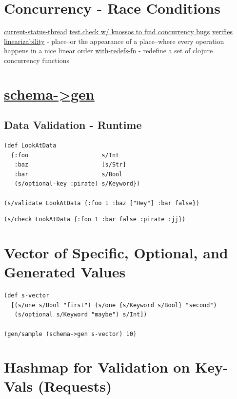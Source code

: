\documentclass[11pt]{article}
\begin{document}
\section{Concurrency - Race Conditions}
\label{sec-23}

\href{https://groups.google.com/forum/#!topic/clojure-dev/GhG-PbKW_ew}{current-status-thread}
\href{https://github.com/philandstuff/test-check-knossos}{test.check w/ knossos to find concurrency bugs}
\href{https://github.com/aphyr/knossos}{verifies linearizability} -
place–or the appearance of a place–where every
operation happens in a nice linear order
\href{http://clojuredocs.org/clojure_core/clojure.core/with-redefs-fn}{with-redefs-fn} -
redefine a set of clojure concurrency functions
\section{\href{https://github.com/zeeshanlakhani/schema-gen}{schema->gen}}
\label{sec-24}

\subsection{Data Validation - Runtime}
\label{sec-24-1}

\begin{verbatim}
(def LookAtData
  {:foo                     s/Int
   :baz                     [s/Str]
   :bar                     s/Bool
   (s/optional-key :pirate) s/Keyword})

(s/validate LookAtData {:foo 1 :baz ["Hey"] :bar false})
\end{verbatim}

\begin{verbatim}
(s/check LookAtData {:foo 1 :bar false :pirate :jj})
\end{verbatim}

\section{Vector of Specific, Optional, and Generated Values}
\label{sec-25}
\begin{verbatim}
(def s-vector
  [(s/one s/Bool "first") (s/one {s/Keyword s/Bool} "second")
   (s/optional s/Keyword "maybe") s/Int])

(gen/sample (schema->gen s-vector) 10)
\end{verbatim}
\section{Hashmap for Validation on Key-Vals (Requests)}
\label{sec-26}
\end{document}
